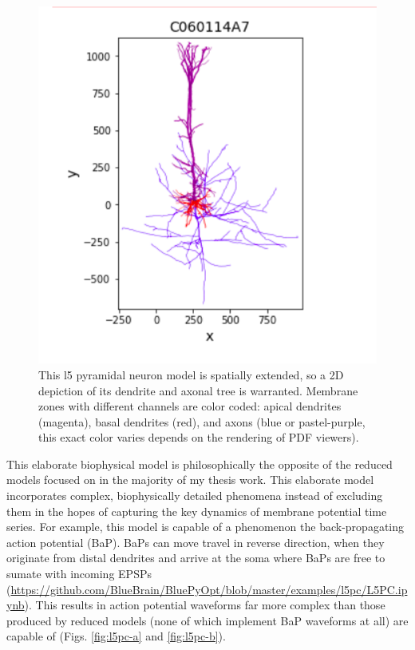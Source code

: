 \begin{figure}%
  \begin{center}
    \includegraphics[scale=0.8]{figures/morphology_view.png}
    \caption[Visualization of the Layer 5 Pyramidal neuron Tree Form]{This l5 pyramidal neuron model is spatially extended, so a 2D depiction of its dendrite and axonal tree is warranted.
    Membrane zones with different channels are color coded: apical dendrites (magenta), basal dendrites (red), and axons (blue or pastel-purple, this exact color varies depends on the rendering of PDF viewers).
    }
  \label{fig:brief_shape}
  \end{center}
\end{figure}

This elaborate biophysical model is philosophically the opposite of the reduced models focused on in the majority of my thesis work. This elaborate model incorporates complex, biophysically detailed phenomena instead of excluding them in the hopes of capturing the key dynamics of membrane potential time series.
For example, this model is capable of a phenomenon the back-propagating action potential (BaP). BaPs can move travel in reverse direction, when they originate from distal dendrites and arrive at the soma where BaPs are free to sumate with incoming EPSPs (\url{https://github.com/BlueBrain/BluePyOpt/blob/master/examples/l5pc/L5PC.ipynb}).
This results in action potential waveforms far more complex than those produced by reduced models (none of which implement BaP waveforms at all) are capable of (Figs. \ref{fig:l5pc-a} and \ref{fig:l5pc-b}).

